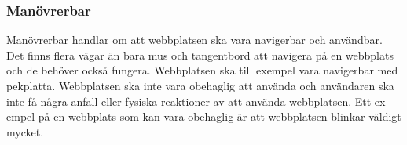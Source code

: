 \documentclass[11p]{article}
\begin{document}
\begin{otherlanguage}{swedish}
    \subsubsection{Manövrerbar}
    Manövrerbar handlar om att webbplatsen ska vara navigerbar och användbar.
    Det finns flera vägar än bara mus och tangentbord att navigera på en webbplats och de behöver också fungera.
    Webbplatsen ska till exempel vara navigerbar med pekplatta.
    Webbplatsen ska inte vara obehaglig att använda och användaren ska inte få några anfall eller fysiska reaktioner av att använda webbplatsen.%
    Ett exempel på en webbplats som kan vara obehaglig är att webbplatsen blinkar väldigt mycket.


\end{otherlanguage}
\end{document}
